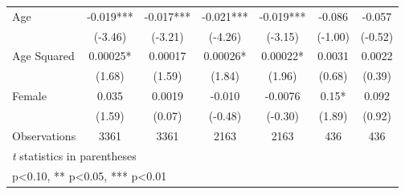 \begin{table}[htbp]
\begin{tabular}{l*{6}{c}}
Age             &   -0.019***&   -0.017***&   -0.021***&   -0.019***&   -0.086   &   -0.057   \\
                &  (-3.46)   &  (-3.21)   &  (-4.26)   &  (-3.15)   &  (-1.00)   &  (-0.52)   \\
Age Squared     &  0.00025*  &  0.00017   &  0.00026*  &  0.00022*  &   0.0031   &   0.0022   \\
                &   (1.68)   &   (1.59)   &   (1.84)   &   (1.96)   &   (0.68)   &   (0.39)   \\
Female          &    0.035   &   0.0019   &   -0.010   &  -0.0076   &     0.15*  &    0.092   \\
                &   (1.59)   &   (0.07)   &  (-0.48)   &  (-0.30)   &   (1.89)   &   (0.92)   \\
\hline
Observations    &     3361   &     3361   &     2163   &     2163   &      436   &      436   \\
\hline\hline
\multicolumn{7}{l}{\footnotesize \textit{t} statistics in parentheses}\\
\multicolumn{7}{l}{\footnotesize * p<0.10, ** p<0.05, *** p<0.01}\\
\end{tabular}
\end{table}
